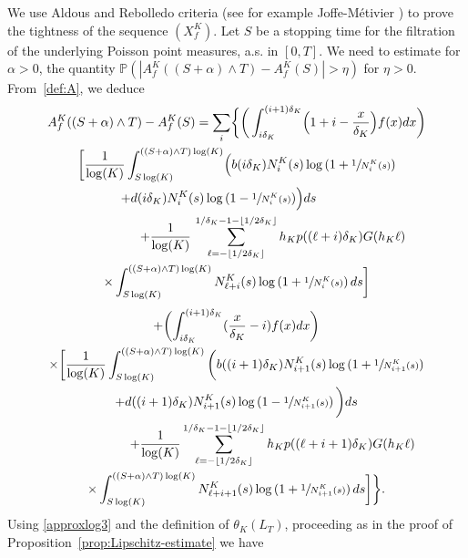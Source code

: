 \documentclass[10pt]{amsart}
\theoremstyle{plain}
\theoremstyle{remark}
\begin{document}
We use Aldous and Rebolledo criteria (see for example Joffe-Métivier \cite{joffemetivier}) to prove the tightness of the sequence $(X^K_f)$.
Let $S$ be a stopping time for the filtration of the underlying Poisson point measures, a.s. in $[0,T]$.
We need to estimate for $\alpha>0$, the quantity
$\mathbb{P}(|A^K_{f}((S+\alpha)\wedge T) -A^K_{f} (S)|>\eta)$ for $\eta>0$.
From~\eqref{def:A}, we deduce
\begin{multline*}
A^K_{f}((S+\alpha)\wedge T) -A^K_{f} (S) =
 \sum_{i} \biggl\{\bigg(\int_{i\delta_{K}}^{(i+1)\delta_{K}} \Bigl(1+i -{x\over \delta_{K}}\Bigr)f(x)dx \biggr) \\
\bigg[
\frac{1}{\log(K)}\int_{S \log(K)}^{((S+\alpha)\wedge T)\log(K)}\Bigl(b(i \delta_{K})N^K_{i}(s)\log\left(1+\sfrac{1}{N^K_{i}(s)}\right)\\
\hspace*{-1cm}+ d(i \delta_{K})N^K_{i}(s)\log\left(1-\sfrac{1}{N^K_{i}(s)}\right)\Bigr) ds
\\
\hspace*{2cm}+{\frac{1}{\log(K)}}\, \sum_{\ell=-\lfloor 1/2\delta_K\rfloor}^{1/\delta_K-1-\lfloor 1/2\delta_K\rfloor}h_Kp((\ell+i)\delta_K)G(h_K\ell)\\
\times\int_{S \log(K)}^{((S+\alpha)\wedge T)\log(K)} N^K_{\ell+i}(s)\log\left(1+\sfrac{1}{N^K_{i}(s)}\right) ds\bigg]
\end{multline*}%
\vspace*{-1.5\baselineskip}
\begin{multline*}
+ \biggl(\int_{i\delta_{K}}^{(i+1)\delta_{K}} ({x\over \delta_{K}}-i) f(x)dx\biggr)\\
\times \bigg[
\frac{1}{\log(K)}\int_{S \log(K)}^{((S+\alpha)\wedge T)\log(K)}\bigg(b((i+1) \delta_{K})N^K_{i+1}(s)\log\left(1+\sfrac{1}{N^K_{i+1}(s)}\right)\\
+ d((i +1) \delta_{K})N^K_{i+1}(s)\log\left(1-\sfrac{1}{N^K_{i+1}(s)}\right)\bigg) ds \\
\hspace*{2cm} +{\frac{1}{\log(K)}} \sum_{\ell=-\lfloor 1/2\delta_K\rfloor}^{1/\delta_K-1-\lfloor 1/2\delta_K\rfloor}h_Kp((\ell+i+1)\delta_K)G(h_K\ell)
\\
\times \int_{S \log(K)}^{((S+\alpha)\wedge T)\log(K)} N^K_{\ell+i+1}(s)\log\left(1+\sfrac{1}{N^K_{i+1}(s)}\right) ds\bigg]\bigg\}.
\end{multline*}
Using \eqref{approxlog3} and the definition of $\theta_K(L_T)$, proceeding as in the proof of Proposition~\ref{prop:Lipschitz-estimate} we have
\end{document}
